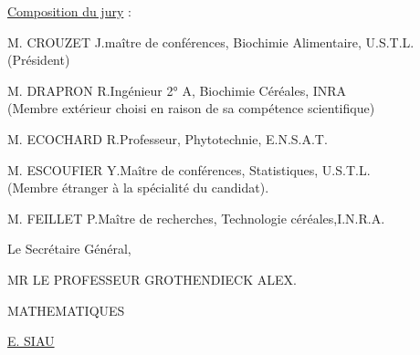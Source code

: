 \uline{Composition du jury} :

M. CROUZET J.\quad maître de conférences, Biochimie Alimentaire, U.S.T.L. (Président)

M. DRAPRON R.\quad Ingénieur 2° A, Biochimie Céréales, INRA\\
\hspace*{3cm}(Membre extérieur choisi en raison de sa compétence scientifique)

M. ECOCHARD R.\quad Professeur, Phytotechnie, E.N.S.A.T.

M. ESCOUFIER Y.\quad Maître de conférences, Statistiques, U.S.T.L.\\
\hspace*{3cm}(Membre étranger à la spécialité du candidat).

M. FEILLET P.\quad Maître de recherches, Technologie céréales,I.N.R.A.

Le Secrétaire Général,

MR LE PROFESSEUR GROTHENDIECK ALEX.


MATHEMATIQUES

\uline{E. SIAU}
